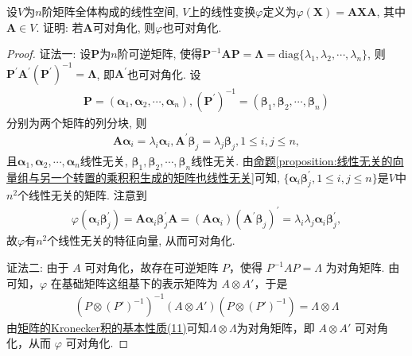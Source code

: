 \documentclass[../../main.tex]{subfiles}
\begin{document}
\begin{example}
设\(V\)为\(n\)阶矩阵全体构成的线性空间, \(V\)上的线性变换\(\varphi\)定义为\(\varphi(\boldsymbol{X})=\boldsymbol{A}\boldsymbol{X}\boldsymbol{A}\), 其中\(\boldsymbol{A}\in V\). 证明: 若\(\boldsymbol{A}\)可对角化, 则\(\varphi\)也可对角化.
\end{example}
\begin{proof}
{\color{blue}证法一:}
设\(\boldsymbol{P}\)为\(n\)阶可逆矩阵, 使得\(\boldsymbol{P}^{-1}\boldsymbol{AP}=\boldsymbol{\Lambda}=\mathrm{diag}\{\lambda_{1},\lambda_{2},\cdots,\lambda_{n}\}\), 则\(\boldsymbol{P}^{\prime}\boldsymbol{A}^{\prime}(\boldsymbol{P}^{\prime})^{-1}=\boldsymbol{\Lambda}\), 即\(\boldsymbol{A}^{\prime}\)也可对角化. 设
\begin{align*}
\boldsymbol{P}=(\boldsymbol{\alpha}_{1},\boldsymbol{\alpha}_{2},\cdots,\boldsymbol{\alpha}_{n}), (\boldsymbol{P}^{\prime})^{-1}=(\boldsymbol{\beta}_{1},\boldsymbol{\beta}_{2},\cdots,\boldsymbol{\beta}_{n})
\end{align*}
分别为两个矩阵的列分块, 则
\begin{align*}
\boldsymbol{A}\boldsymbol{\alpha}_{i}=\lambda_{i}\boldsymbol{\alpha}_{i}, \boldsymbol{A}^{\prime}\boldsymbol{\beta}_{j}=\lambda_{j}\boldsymbol{\beta}_{j}, 1\leq i,j\leq n,
\end{align*}
且\(\boldsymbol{\alpha}_{1},\boldsymbol{\alpha}_{2},\cdots,\boldsymbol{\alpha}_{n}\)线性无关, \(\boldsymbol{\beta}_{1},\boldsymbol{\beta}_{2},\cdots,\boldsymbol{\beta}_{n}\)线性无关. 由\hyperref[proposition:线性无关的向量组与另一个转置的乘积积生成的矩阵也线性无关]{命题\ref{proposition:线性无关的向量组与另一个转置的乘积积生成的矩阵也线性无关}}可知, \(\{\boldsymbol{\alpha}_{i}\boldsymbol{\beta}_{j}^{\prime},1\leq i,j\leq n\}\)是\(V\)中\(n^{2}\)个线性无关的矩阵. 注意到
\begin{align*}
\varphi(\boldsymbol{\alpha}_{i}\boldsymbol{\beta}_{j}^{\prime})=\boldsymbol{A}\boldsymbol{\alpha}_{i}\boldsymbol{\beta}_{j}^{\prime}\boldsymbol{A}=(\boldsymbol{A}\boldsymbol{\alpha}_{i})(\boldsymbol{A}^{\prime}\boldsymbol{\beta}_{j})^{\prime}=\lambda_{i}\lambda_{j}\boldsymbol{\alpha}_{i}\boldsymbol{\beta}_{j}^{\prime},
\end{align*}
故\(\varphi\)有\(n^{2}\)个线性无关的特征向量, 从而可对角化. 

{\color{blue}证法二:}
由于 $A$ 可对角化，故存在可逆矩阵 $P$，使得 $P^{-1}AP = \varLambda$ 为对角矩阵. 由可知，$\varphi$ 在基础矩阵这组基下的表示矩阵为 $A\otimes A'$，于是
\begin{align*}
(P\otimes (P')^{-1})^{-1}(A\otimes A')(P\otimes (P')^{-1})=\varLambda\otimes\varLambda
\end{align*}
由\hyperref[矩阵的Kronecker积的基本性质(11)]{矩阵的Kronecker积的基本性质(11)}可知$\varLambda\otimes\varLambda$为对角矩阵，即 $A\otimes A'$ 可对角化，从而 $\varphi$ 可对角化. 
\end{proof}
\end{document}
